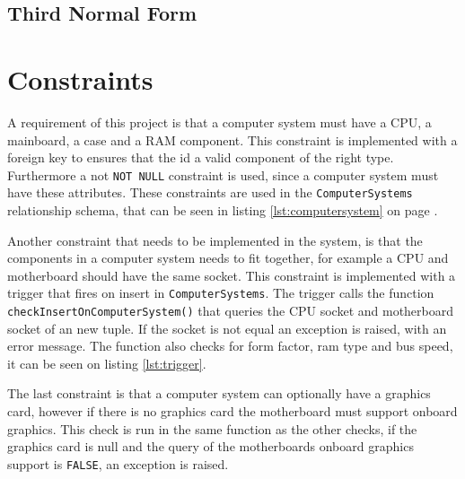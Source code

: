 \documentclass[12pt,a4paper]{article}
\begin{document}
\subsection{Third Normal Form}


\section{Constraints}
A requirement of this project is that a computer system must have a CPU, a mainboard, a case and a RAM component. 
This constraint is implemented with a foreign key to ensures that the id a valid component of the right type.
Furthermore a not \texttt{NOT NULL} constraint is used, since a computer system must have these attributes. 
These constraints are used in the \texttt{ComputerSystems} relationship schema, that can be seen in listing \ref{lst:computersystem} on page \pageref{lst:computersystem}.

Another constraint that needs to be implemented in the system, is that the components in a computer system needs to fit together, for example a CPU and motherboard should have the same socket.
This constraint is implemented with a trigger that fires on insert in \texttt{ComputerSystems}. The trigger calls the function \texttt{checkInsertOnComputerSystem()} that queries the CPU socket and motherboard socket of an new tuple. If the socket is not equal an exception is raised, with an error message. The function also checks for form factor, ram type and bus speed, it can be seen on listing \ref{lst:trigger}.

The last constraint is that a computer system can optionally have a graphics card, however if there is no graphics card the motherboard must support onboard graphics. 
This check is run in the same function as the other checks, if the  graphics card is null and the query of the motherboards onboard graphics support is \texttt{FALSE}, an exception is raised. 
\end{document}
